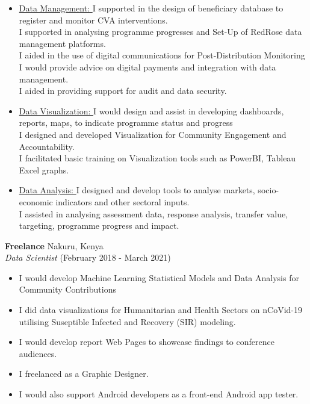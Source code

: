 \documentclass[line,margin,10pt]{res}
\begin{document}
\begin{resume}
\begin{itemize}
    I provided technical support for KoBo Toolbox/ODK srver set-up and forms creation.\\
    I designed survey forms(Assessment, Market Monitoring, beneficiary registration and identification)\\
    \item \underline{Data Management: }
    I supported in the design of beneficiary database to register and monitor CVA interventions.\\
    I supported in analysing programme progresses and Set-Up of RedRose data management platforms.\\
    I aided in the use of digital communications for Post-Distribution Monitoring\\
    I would provide advice on digital payments and integration with data management.\\
    I aided in providing support for audit and data security.\\
    \item \underline{Data Visualization: }
    I would design and assist in developing dashboards, reports, maps, to indicate programme status and progress\\
    I designed and developed Visualization for Community Engagement and Accountability.\\
    I facilitated basic training on Visualization tools such as PowerBI, Tableau Excel graphs.\\
    \item \underline{Data Analysis: }
    I designed and develop tools to analyse markets, socio-economic indicators and other sectoral inputs.\\
    I assisted in analysing assessment data, response analysis, transfer value, targeting, programme progress and impact.\\
\end{itemize}

\textbf{Freelance} \hfill Nakuru, Kenya\\
{\sl Data Scientist} \hfill (February 2018 - March 2021)
\begin{itemize} \itemsep -2pt
    \item I would develop Machine Learning Statistical Models and Data Analysis for Community Contributions
    \item I did data visualizations for Humanitarian and Health Sectors on nCoVid-19 utilising Suseptible Infected and Recovery (SIR) modeling.
    \item I would develop report Web Pages to showcase findings to conference audiences.
    \item I freelanced as a Graphic Designer.
    \item I would also support Android developers as a front-end Android app tester.
\end{itemize}


\end{resume}
\end{document}
